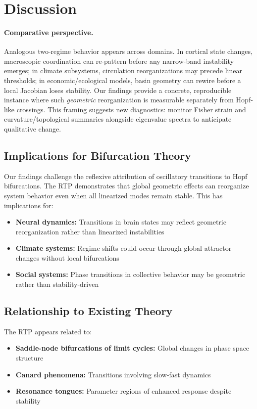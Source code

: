 \documentclass[11pt,twocolumn]{article}
\begin{document}
\section{Discussion}

\paragraph{Comparative perspective.}
Analogous two-regime behavior appears across domains. In cortical state changes, macroscopic coordination can re-pattern before any narrow-band instability emerges; in climate subsystems, circulation reorganizations may precede linear thresholds; in economic/ecological models, basin geometry can rewire before a local Jacobian loses stability. Our findings provide a concrete, reproducible instance where such \emph{geometric} reorganization is measurable separately from Hopf-like crossings. This framing suggests new diagnostics: monitor Fisher strain and curvature/topological summaries alongside eigenvalue spectra to anticipate qualitative change.

\subsection{Implications for Bifurcation Theory}

Our findings challenge the reflexive attribution of oscillatory transitions to Hopf bifurcations. The RTP
demonstrates that global geometric effects can reorganize system behavior even when all linearized modes remain
stable. This has implications for:

\begin{itemize}
  \item \textbf{Neural dynamics:} Transitions in brain states may reflect geometric reorganization rather than
        linearized instabilities
  \item \textbf{Climate systems:} Regime shifts could occur through global attractor changes without local
        bifurcations
  \item \textbf{Social systems:} Phase transitions in collective behavior may be geometric rather than
        stability-driven
\end{itemize}

\subsection{Relationship to Existing Theory}

The RTP appears related to:
\begin{itemize}
  \item \textbf{Saddle-node bifurcations of limit cycles:} Global changes in phase space structure
  \item \textbf{Canard phenomena:} Transitions involving slow-fast dynamics
  \item \textbf{Resonance tongues:} Parameter regions of enhanced response despite stability
\end{itemize}
\end{document}
